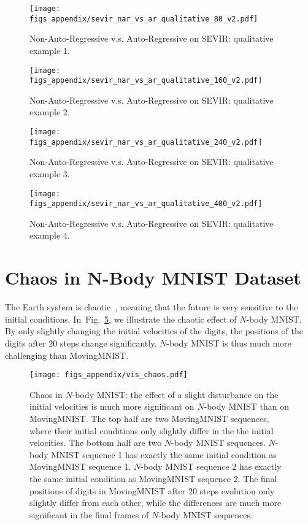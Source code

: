 \documentclass{article}
\newcommand{\figref}[1]{Fig.~\ref{#1}}
\def\nbody{$N$-body MNIST}
\begin{document}
\begin{figure}[!tb]
\centering
\texttt{[image: figs\_appendix/sevir\_nar\_vs\_ar\_qualitative\_80\_v2.pdf]}
    \caption{Non-Auto-Regressive v.s. Auto-Regressive on SEVIR: qualitative example 1.}
    \label{fig:nar_vs_ar_80}
\end{figure}
\begin{figure}[!tb]
\centering
\texttt{[image: figs\_appendix/sevir\_nar\_vs\_ar\_qualitative\_160\_v2.pdf]}
    \caption{Non-Auto-Regressive v.s. Auto-Regressive on SEVIR: qualitative example 2.}
    \label{fig:nar_vs_ar_160}
\end{figure}
\begin{figure}[!tb]
\centering
\texttt{[image: figs\_appendix/sevir\_nar\_vs\_ar\_qualitative\_240\_v2.pdf]}
    \caption{Non-Auto-Regressive v.s. Auto-Regressive on SEVIR: qualitative example 3.}
    \label{fig:nar_vs_ar_240}
\end{figure}
\begin{figure}[!tb]
\centering
\texttt{[image: figs\_appendix/sevir\_nar\_vs\_ar\_qualitative\_400\_v2.pdf]}
    \caption{Non-Auto-Regressive v.s. Auto-Regressive on SEVIR: qualitative example 4.}
    \label{fig:nar_vs_ar_400}
\end{figure}

\clearpage
\section{Chaos in N-Body MNIST Dataset}
\label{sec:chaos-nbody}
The Earth system is chaotic~\cite{tapley2004grace}, meaning that the future is very sensitive to the initial conditions. In~\figref{fig:chaos_nbody}, we illustrate the chaotic effect of \nbody{}. By only slightly changing the initial velocities of the digits, the positions of the digits after $20$ steps change significantly. \nbody{} is thus much more challenging than MovingMNIST.

\begin{figure}[!tb]
    \centering
    \texttt{[image: figs\_appendix/vis\_chaos.pdf]}
\caption{Chaos in \nbody{}: the effect of a slight disturbance on the initial velocities is much more significant on \nbody{} than on MovingMNIST. The top half are two MovingMNIST sequences, where their initial conditions only slightly differ in the the initial velocities. The bottom half are two \nbody{} sequences. \nbody{} sequence 1 has exactly the same initial condition as MovingMNIST sequence 1. \nbody{} sequence 2 has exactly the same initial condition as MovingMNIST sequence 2. The final positions of digits in MovingMNIST after $20$ steps evolution only slightly differ from each other, while the differences are much more significant in the final frames of \nbody{} sequences.}
    \label{fig:chaos_nbody}
\end{figure}
\end{document}
